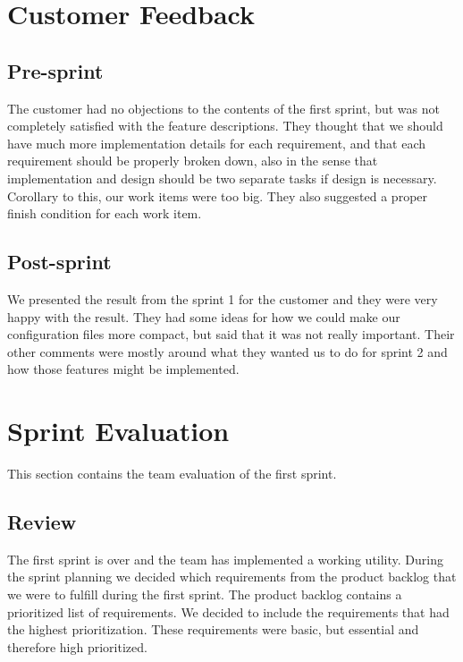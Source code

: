 \section{Customer Feedback}

\subsection{Pre-sprint}
The customer had no objections to the contents of the first sprint, but was not
completely satisfied with the feature descriptions. They thought that we should
have much more implementation details for each requirement, and that each
requirement should be properly broken down, also in the sense that
implementation and design should be two separate tasks if design is necessary.
Corollary to this, our work items were too big. They also suggested a proper
finish condition for each work item.

\subsection{Post-sprint}
We presented the result from the sprint 1 for the customer and they were very
happy with the result. They had some ideas for how we could make our
configuration files more compact, but said that it was not really important.
Their other comments were mostly around what they wanted us to do for sprint 2
and how those features might be implemented.


\section{Sprint Evaluation}
This section contains the team evaluation of the first sprint.

\subsection{Review}
The first sprint is over and the team has implemented a working \gls{utility}. During
the sprint planning we decided which requirements from the product backlog that
we were to fulfill during the first sprint. The product backlog contains a
prioritized list of requirements. We decided to include the requirements that
had the highest prioritization. These requirements were basic, but essential
and therefore high prioritized.
   
